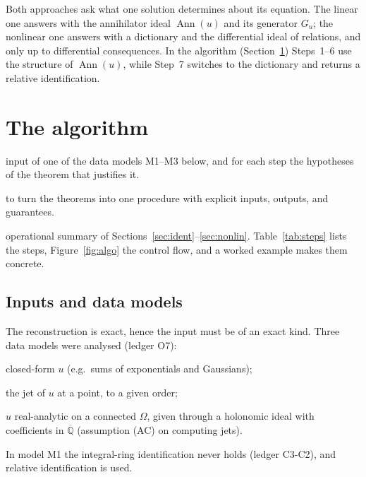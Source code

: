 \documentclass[11pt,a4paper]{article}
\theoremstyle{definition}
\newcommand{\led}[1]{\textcolor{cG}{\textsf{\footnotesize(ledger #1)}}}
\newcommand{\sectionbrief}[3]{\begin{leadin}\begin{description}[nosep,leftmargin=3.0cm,labelwidth=2.8cm]
  \item[Starting from] #1
  \item[Why this section] #2
  \item[Role in the paper] #3
  \end{description}\end{leadin}}
\newcommand{\Ann}{\operatorname{Ann}}
\begin{document}


\begin{keypoint}
Both approaches ask what one solution determines about its equation. The linear one answers with the annihilator ideal $\Ann(u)$ and its generator $G_u$; the nonlinear one answers with a dictionary and the differential ideal of relations, and only up to differential consequences. In the algorithm (Section~\ref{sec:algo}) Steps~1--6 use the structure of $\Ann(u)$, while Step~7 switches to the dictionary and returns a relative identification.
\end{keypoint}

\section{The algorithm}\label{sec:algo}
\sectionbrief
{input of one of the data models M1--M3 below, and for each step the hypotheses of the theorem that justifies it.}
{to turn the theorems into one procedure with explicit inputs, outputs, and guarantees.}
{operational summary of Sections~\ref{sec:ident}--\ref{sec:nonlin}. Table~\ref{tab:steps} lists the steps, Figure~\ref{fig:algo} the control flow, and a worked example makes them concrete.}

\subsection{Inputs and data models}
The reconstruction is exact, hence the input must be of an exact kind. Three data models were analysed \led{O7}:
\begin{description}[nosep,leftmargin=2.2cm,labelwidth=2cm]
\item[M1] closed-form $u$ (e.g.\ sums of exponentials and Gaussians);
\item[M2] the jet of $u$ at a point, to a given order;
\item[M3] $u$ real-analytic on a connected $\Omega$, given through a holonomic ideal with coefficients in $\overline{\mathbb Q}$ (assumption (AC) on computing jets).
\end{description}
In model M1 the integral-ring identification never holds \led{C3-C2}, and relative identification is used.
\end{document}
